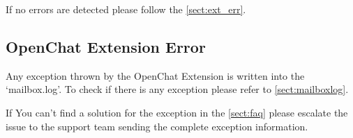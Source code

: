If no errors are detected please follow the \autoref{sect:ext_err}.

\subsection[Extension Error]{OpenChat Extension Error}
\label{sect:ext_err}
Any exception thrown by the OpenChat Extension is written into the `mailbox.log'. To check if there is any exception please
refer to \autoref{sect:mailboxlog}.

If You can't find a solution for the exception in the \autoref{sect:faq} please escalate the issue to the support team
sending the complete exception information\footnotemark[1].


